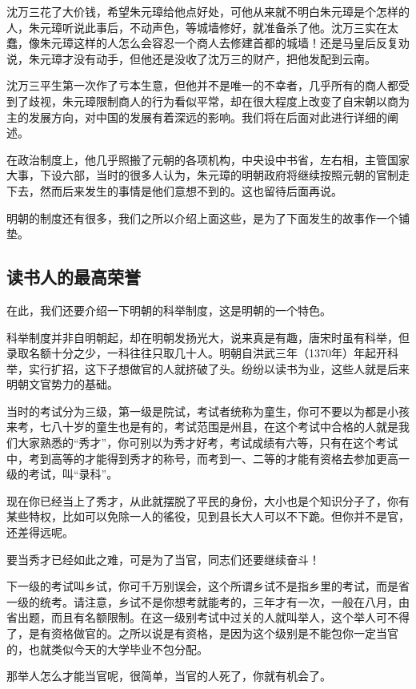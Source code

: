 \begin{multicols}{\theparacolNo}
		沈万三花了大价钱，希望朱元璋给他点好处，可他从来就不明白朱元璋是个怎样的人，朱元璋听说此事后，不动声色，等城墙修好，就准备杀了他。沈万三实在太蠢，像朱元璋这样的人怎么会容忍一个商人去修建首都的城墙！还是马皇后反复劝说，朱元璋才没有动手，但他还是没收了沈万三的财产，把他发配到云南。

		沈万三平生第一次作了亏本生意，但他并不是唯一的不幸者，几乎所有的商人都受到了歧视，朱元璋限制商人的行为看似平常，却在很大程度上改变了自宋朝以商为主的发展方向，对中国的发展有着深远的影响。我们将在后面对此进行详细的阐述。

		在政治制度上，他几乎照搬了元朝的各项机构，中央设中书省，左右相，主管国家大事，下设六部，当时的很多人认为，朱元璋的明朝政府将继续按照元朝的官制走下去，然而后来发生的事情是他们意想不到的。这也留待后面再说。

		明朝的制度还有很多，我们之所以介绍上面这些，是为了下面发生的故事作一个铺垫。

		\subsection{读书人的最高荣誉}
		在此，我们还要介绍一下明朝的科举制度，这是明朝的一个特色。

		科举制度并非自明朝起，却在明朝发扬光大，说来真是有趣，唐宋时虽有科举，但录取名额十分之少，一科往往只取几十人。明朝自洪武三年（1370年）年起开科举，实行扩招，这下子想做官的人就挤破了头。纷纷以读书为业，这些人就是后来明朝文官势力的基础。

		当时的考试分为三级，第一级是院试，考试者统称为童生，你可不要以为都是小孩来考，七八十岁的童生也是有的，考试范围是州县，在这个考试中合格的人就是我们大家熟悉的“秀才”，你可别以为秀才好考，考试成绩有六等，只有在这个考试中，考到高等的才能得到秀才的称号，而考到一、二等的才能有资格去参加更高一级的考试，叫“录科”。

		现在你已经当上了秀才，从此就摆脱了平民的身份，大小也是个知识分子了，你有某些特权，比如可以免除一人的徭役，见到县长大人可以不下跪。但你并不是官，还差得远呢。

		要当秀才已经如此之难，可是为了当官，同志们还要继续奋斗！

		下一级的考试叫乡试，你可千万别误会，这个所谓乡试不是指乡里的考试，而是省一级的统考。请注意，乡试不是你想考就能考的，三年才有一次，一般在八月，由省出题，而且有名额限制。在这一级别考试中过关的人就叫举人，这个举人可不得了，是有资格做官的。之所以说是有资格，是因为这个级别是不能包你一定当官的，也就类似今天的大学毕业不包分配。

		那举人怎么才能当官呢，很简单，当官的人死了，你就有机会了。


\end{multicols}
